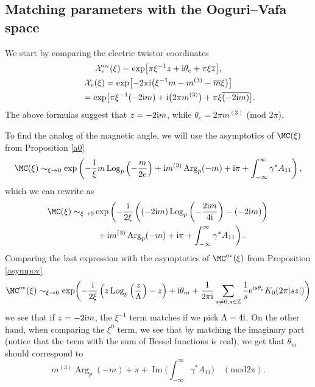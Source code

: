 \subsection{Matching parameters with the Ooguri--Vafa space}\label{OVP}

We start by comparing the electric twistor coordinates
\begin{gather}
 \mathcal{X}_e^{\text{ov}}(\xi)=\exp\bigl[\pi \xi^{-1}z+{\rm i}\theta_e +\pi\xi \overline{z}\bigr],\nonumber\\
 \mathcal{X}_e(\xi)=\exp \bigl[-2\pi {\rm i} \bigl(\xi^{-1}m -m^{(3)}-\overline{m}\xi\bigr)\bigr]\nonumber\\
 \phantom{ \mathcal{X}_e(\xi)}{}= \exp \bigl[\pi \xi^{-1}(-2{\rm i}m) + {\rm i}\bigl(2\pi m^{(3)}\bigr) + \pi \xi \overline{(-2{\rm i}m)}\bigr].\label{elecmatch}
\end{gather}
The above formulas suggest that $z=-2{\rm i}m$, while $\theta_e=2\pi m^{(3)}$ (mod $2\pi$).

To find the analog of the magnetic angle, we will use the asymptotics of $\MC(\xi)$ from Proposition \ref{a0}
\begin{equation*}
 \MC(\xi)\sim_{\xi \to 0}\exp \left(-\frac{1}{\xi}m\operatorname{Log}_p\left(-\frac{m}{2e}\right)+{\rm i}m^{(3)}\operatorname{Arg}_p(-m)+{\rm i}\pi +\int_{-\infty}^{\infty}\gamma^*A_{11}\right),
\end{equation*}
which we can rewrite as
\begin{align}
 \MC(\xi)\sim_{\xi \to 0}&\exp \left(-\frac{{\rm i}}{2\xi}\left((-2{\rm i}m)\operatorname{Log}_p\left(-\frac{2{\rm i}m}{4{\rm i}}\right)-(-2{\rm i}m)\right)\right.\nonumber\\
 &\left.{} +{\rm i}m^{(3)}\operatorname{Arg}_p(-m)+{\rm i}\pi +\int_{-\infty}^{\infty}\gamma^*A_{11}\right).\label{asy1}
\end{align}
Comparing the last expression with the asymptotics of $\MC^{\text{ov}}(\xi)$ from Proposition \ref{asympov}
\begin{equation}\label{asy2}
 \MC^{\text{ov}}(\xi) \sim_{\xi \to 0} \exp \biggl(-\frac{{\rm i}}{2\xi}\left(z\operatorname{Log}_p\left(\frac{z}{\Lambda}\right)-z\right) +{\rm i}\theta_m +\frac{1}{2\pi {\rm i}}\sum_{s\neq 0, s \in \mathbb{Z}}\frac{1}{s}{\rm e}^{{\rm i}s\theta_e}K_0(2\pi |sz|) \biggr)
\end{equation}
we see that if $z=-2{\rm i}m $, the $\xi^{-1}$ term matches if we pick $\Lambda = 4{\rm i}$. On the other hand, when comparing the $\xi^{0}$ term, we see that by matching the imaginary part (notice that the term with the sum of Bessel functions is real), we get that $\theta_m$ should correspond to
\begin{equation*}
 m^{(3)}\operatorname{Arg}_p(-m)+\pi +\operatorname{Im}\bigg(\int_{-\infty}^{\infty}\gamma^*A_{11}\bigg) \quad (\text{mod} 2\pi).
\end{equation*}

